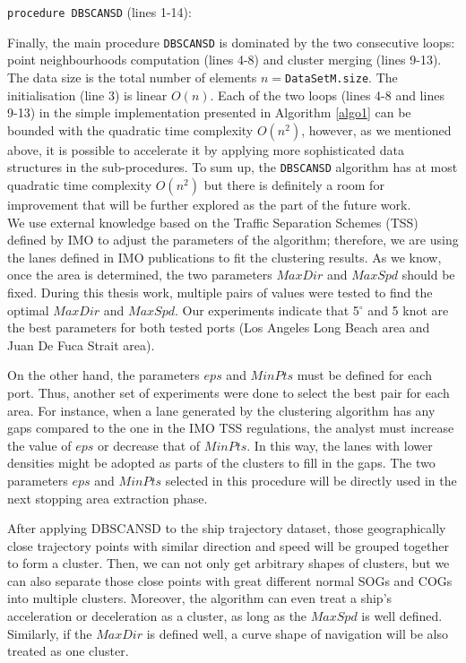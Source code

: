 \documentclass[12pt,glossary]{dalcsthesis}
\begin{document}
\noindent\texttt{procedure DBSCANSD} (lines 1-14):

\noindent Finally, the main procedure \texttt{DBSCANSD} is dominated by the two consecutive loops: point neighbourhoods computation (lines 4-8) and cluster merging (lines 9-13). The data size is the total number of elements $n=$\texttt{DataSetM.size}. The initialisation (line 3) is linear $O(n)$. Each of the two loops (lines 4-8 and lines 9-13) in the simple implementation presented in Algorithm \ref{algo1} can be bounded with the quadratic time complexity $O(n^2)$, however, as we mentioned above, it is possible to accelerate it by applying more sophisticated data structures in the sub-procedures. To sum up, the \texttt{DBSCANSD} algorithm has at most quadratic time complexity $O(n^2)$ but there is definitely a room for improvement that will be further explored as the part of the future work. \\



We use external knowledge based on the Traffic Separation Schemes (TSS) \cite{tss} defined by IMO to adjust the parameters of the algorithm; therefore, we are using the lanes defined in IMO publications to fit the clustering results. As we know, once the area is determined, the two parameters $MaxDir$ and $MaxSpd$ should be fixed. During this thesis work, multiple pairs of values were tested to find the optimal $MaxDir$ and $MaxSpd$. Our experiments indicate that 5$^{\circ}$ and 5 knot are the best parameters for both tested ports (Los Angeles Long Beach area and Juan De Fuca Strait area). 

On the other hand, the parameters $eps$ and $MinPts$ must be defined for each port. Thus, another set of experiments were done to select the best pair for each area. For instance, when a lane generated by the clustering algorithm has any gaps compared to the one in the IMO TSS regulations, the analyst must increase the value of $eps$ or decrease that of $MinPts$. In this way, the lanes with lower densities might be adopted as parts of the clusters to fill in the gaps. The two parameters $eps$ and $MinPts$ selected in this procedure will be directly used in the next stopping area extraction phase.

After applying DBSCANSD to the ship trajectory dataset, those geographically close trajectory points with similar direction and speed will be grouped together to form a cluster. Then, we can not only get arbitrary shapes of clusters, but we can also separate those close points with great different normal SOGs and COGs into multiple clusters. Moreover, the algorithm can even treat a ship's acceleration or deceleration as a cluster, as long as the $MaxSpd$ is well defined. Similarly, if the $MaxDir$ is defined well, a curve shape of navigation will be also treated as one cluster.
\end{document}
